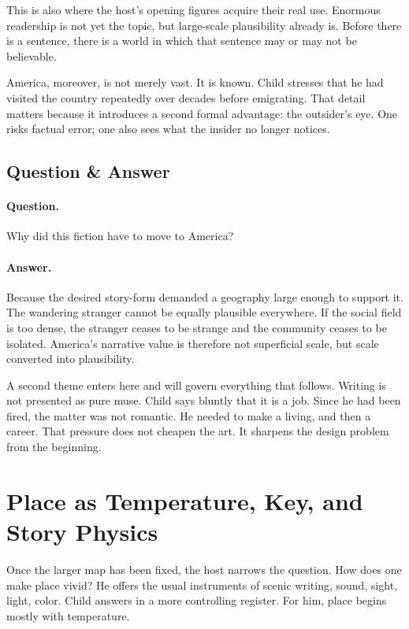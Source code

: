 This is also where the host's opening figures acquire their real use. Enormous readership is not yet the topic, but large-scale plausibility already is. Before there is a sentence, there is a world in which that sentence may or may not be believable.

America, moreover, is not merely vast. It is known. Child stresses that he had visited the country repeatedly over decades before emigrating. That detail matters because it introduces a second formal advantage: the outsider's eye. One risks factual error; one also sees what the insider no longer notices.

\subsection{Question \& Answer}

\paragraph{Question.} Why did this fiction have to move to America?

\paragraph{Answer.} Because the desired story-form demanded a geography large enough to support it. The wandering stranger cannot be equally plausible everywhere. If the social field is too dense, the stranger ceases to be strange and the community ceases to be isolated. America's narrative value is therefore not superficial scale, but scale converted into plausibility.

A second theme enters here and will govern everything that follows. Writing is not presented as pure muse. Child says bluntly that it is a job. Since he had been fired, the matter was not romantic. He needed to make a living, and then a career. That pressure does not cheapen the art. It sharpens the design problem from the beginning.

\section{Place as Temperature, Key, and Story Physics}

Once the larger map has been fixed, the host narrows the question. How does one make place vivid? He offers the usual instruments of scenic writing, sound, sight, light, color. Child answers in a more controlling register. For him, place begins mostly with temperature.

